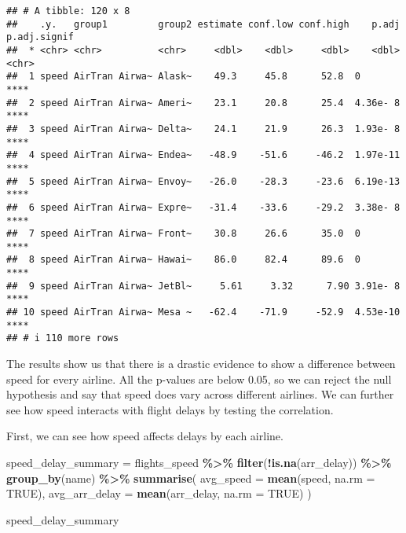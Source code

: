 \documentclass[
]{article}
\newenvironment{Shaded}{\begin{snugshade}}{\end{snugshade}}
\newcommand{\AttributeTok}[1]{\textcolor[rgb]{0.13,0.29,0.53}{#1}}
\newcommand{\ConstantTok}[1]{\textcolor[rgb]{0.56,0.35,0.01}{#1}}
\newcommand{\FunctionTok}[1]{\textcolor[rgb]{0.13,0.29,0.53}{\textbf{#1}}}
\newcommand{\NormalTok}[1]{#1}
\newcommand{\OtherTok}[1]{\textcolor[rgb]{0.56,0.35,0.01}{#1}}
\newcommand{\SpecialCharTok}[1]{\textcolor[rgb]{0.81,0.36,0.00}{\textbf{#1}}}
\begin{document}
\begin{verbatim}
## # A tibble: 120 x 8
##    .y.   group1         group2 estimate conf.low conf.high    p.adj p.adj.signif
##  * <chr> <chr>          <chr>     <dbl>    <dbl>     <dbl>    <dbl> <chr>       
##  1 speed AirTran Airwa~ Alask~    49.3     45.8      52.8  0        ****        
##  2 speed AirTran Airwa~ Ameri~    23.1     20.8      25.4  4.36e- 8 ****        
##  3 speed AirTran Airwa~ Delta~    24.1     21.9      26.3  1.93e- 8 ****        
##  4 speed AirTran Airwa~ Endea~   -48.9    -51.6     -46.2  1.97e-11 ****        
##  5 speed AirTran Airwa~ Envoy~   -26.0    -28.3     -23.6  6.19e-13 ****        
##  6 speed AirTran Airwa~ Expre~   -31.4    -33.6     -29.2  3.38e- 8 ****        
##  7 speed AirTran Airwa~ Front~    30.8     26.6      35.0  0        ****        
##  8 speed AirTran Airwa~ Hawai~    86.0     82.4      89.6  0        ****        
##  9 speed AirTran Airwa~ JetBl~     5.61     3.32      7.90 3.91e- 8 ****        
## 10 speed AirTran Airwa~ Mesa ~   -62.4    -71.9     -52.9  4.53e-10 ****        
## # i 110 more rows
\end{verbatim}

The results show us that there is a drastic evidence to show a
difference between speed for every airline. All the p-values are below
0.05, so we can reject the null hypothesis and say that speed does vary
across different airlines. We can further see how speed interacts with
flight delays by testing the correlation.

First, we can see how speed affects delays by each airline.

\begin{Shaded}
\begin{Highlighting}[]
\NormalTok{speed\_delay\_summary }\OtherTok{=}\NormalTok{ flights\_speed }\SpecialCharTok{\%\textgreater{}\%}
  \FunctionTok{filter}\NormalTok{(}\SpecialCharTok{!}\FunctionTok{is.na}\NormalTok{(arr\_delay)) }\SpecialCharTok{\%\textgreater{}\%}
  \FunctionTok{group\_by}\NormalTok{(name) }\SpecialCharTok{\%\textgreater{}\%}
  \FunctionTok{summarise}\NormalTok{(}
    \AttributeTok{avg\_speed =} \FunctionTok{mean}\NormalTok{(speed, }\AttributeTok{na.rm =} \ConstantTok{TRUE}\NormalTok{),}
    \AttributeTok{avg\_arr\_delay =} \FunctionTok{mean}\NormalTok{(arr\_delay, }\AttributeTok{na.rm =} \ConstantTok{TRUE}\NormalTok{)}
\NormalTok{  )}

\NormalTok{speed\_delay\_summary}
\end{Highlighting}
\end{Shaded}
\end{document}
